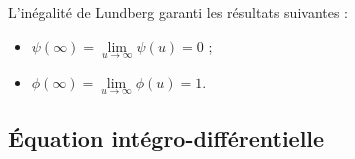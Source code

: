 L'inégalité de Lundberg garanti les résultats suivantes : 

\begin{itemize}
	\item $\displaystyle \psi(\infty) = \lim\limits_{u\to \infty} \psi(u) = 0$ ;
	\item $\displaystyle \phi(\infty) = \lim\limits_{u\to \infty} \phi(u) = 1.$
\end{itemize}

\subsection{Équation intégro-différentielle}































